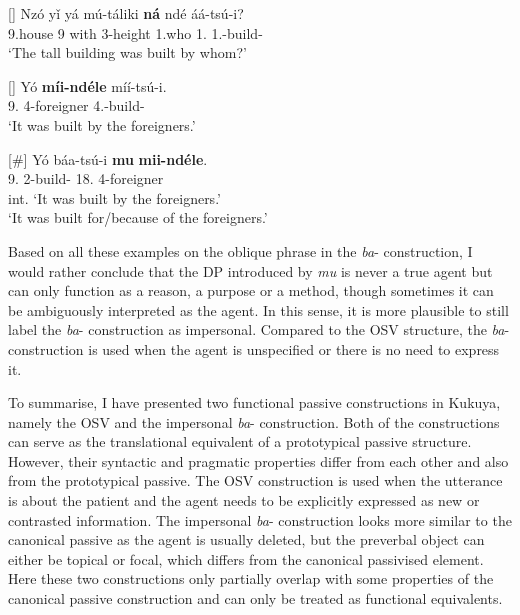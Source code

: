 \documentclass[output=paper,colorlinks,citecolor=brown,
]{langscibook}
\begin{document}
\begin{exe}
    \ex \label{134}
    \begin{xlist}
\ex
[]{
\label{134a}
\gll
Nzó yǐ yá mú-táliki \textbf{ná} ndé áá-tsú-i?\\
9.house 9\Rel{} with 3-height 1.who 1.\Pro{} 1\Sm{}.\Pst{}-build-\Pst{}\\
\trans ‘The tall building was built by whom?’
}

\ex
[]{
\label{134b}
\gll
Yó \textbf{míi-ndéle} míí-tsú-i.\\
9.\Pro{} 4-foreigner 4\Sm{}.\Pst{}-build-\Pst{}\\
\trans ‘It was built by the foreigners.’
}

\ex
[\#]{
\label{134c}
\gll
Yó báa-tsú-i \textbf{mu} \textbf{mii-ndéle}.\\
9.\Pro{} 2\Sm{}-build-\Pst{} 18.\Loc{} 4-foreigner\\
\trans int. ‘It was built by the foreigners.’\\
‘It was built for/because of the foreigners.’    
}


\end{xlist}
\end{exe} 
Based on all these examples on the oblique phrase in the \textit{ba}- construction, I would rather conclude that the DP introduced by \textit{mu} is never a true agent but can only function as a reason, a purpose or a method, though sometimes it can be ambiguously interpreted as the agent. In this sense, it is more plausible to still label the \textit{ba}- construction as impersonal. Compared to the OSV structure, the \textit{ba}- construction is used when the agent is unspecified or there is no need to express it.

To summarise, I have presented two functional passive constructions in Kukuya, namely the OSV and the impersonal \textit{ba}- construction. Both of the constructions can serve as the translational equivalent of a prototypical passive structure. However, their syntactic and pragmatic properties differ from each other and also from the prototypical passive. The OSV construction is used when the utterance is about the patient and the agent needs to be explicitly expressed as new or contrasted information. The impersonal \textit{ba}- construction looks more similar to the canonical passive as the agent is usually deleted, but the preverbal object can either be topical or focal, which differs from the canonical passivised element. Here these two constructions only partially overlap with some properties of the canonical passive construction and can only be treated as functional equivalents.  
\end{document}
